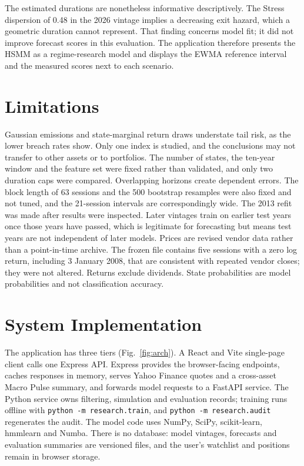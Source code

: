 \documentclass[conference]{IEEEtran}
\begin{document}
The estimated durations are nonetheless informative descriptively. The Stress dispersion of 0.48 in the 2026 vintage implies a decreasing exit hazard, which a geometric duration cannot represent. That finding concerns model fit; it did not improve forecast scores in this evaluation. The application therefore presents the HSMM as a regime-research model and displays the EWMA reference interval and the measured scores next to each scenario.

\section{Limitations}
\label{sec:limitations}
Gaussian emissions and state-marginal return draws understate tail risk, as the lower breach rates show. Only one index is studied, and the conclusions may not transfer to other assets or to portfolios. The number of states, the ten-year window and the feature set were fixed rather than validated, and only two duration caps were compared. Overlapping horizons create dependent errors. The block length of 63 sessions and the 500 bootstrap resamples were also fixed and not tuned, and the 21-session intervals are correspondingly wide. The 2013 refit was made after results were inspected. Later vintages train on earlier test years once those years have passed, which is legitimate for forecasting but means test years are not independent of later models. Prices are revised vendor data rather than a point-in-time archive. The frozen file contains five sessions with a zero log return, including 3 January 2008, that are consistent with repeated vendor closes; they were not altered. Returns exclude dividends. State probabilities are model probabilities and not classification accuracy.

\section{System Implementation}
\label{sec:system}
The application has three tiers (Fig.~\ref{fig:arch}). A React and Vite single-page client calls one Express API. Express provides the browser-facing endpoints, caches responses in memory, serves Yahoo Finance quotes and a cross-asset Macro Pulse summary, and forwards model requests to a FastAPI service. The Python service owns filtering, simulation and evaluation records; training runs offline with \texttt{python -m research.train}, and \texttt{python -m research.audit} regenerates the audit. The model code uses NumPy, SciPy, scikit-learn, hmmlearn and Numba. There is no database: model vintages, forecasts and evaluation summaries are versioned files, and the user's watchlist and positions remain in browser storage.
\end{document}
